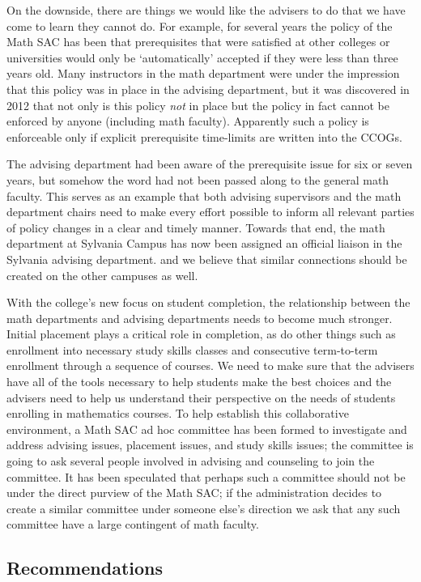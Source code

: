On the downside, there are things we would like the advisers to do that we
have come to learn they cannot do.  For example, for several years the policy
of the Math SAC has been that prerequisites that were satisfied at other
colleges or universities would only be `automatically' accepted if they were
less than three years old.  Many instructors in the math department were under
the impression that this policy was in place in the advising department, but it
was discovered in 2012 that not only is this policy \emph{not} in place but the policy in fact cannot be enforced by anyone
(including math faculty).   Apparently such a policy is enforceable only if
explicit prerequisite time-limits are written into the CCOGs.  

The advising department had been aware of the prerequisite issue for six or
seven years, but somehow the word had not been passed along to the general math
faculty.  This serves as an example that both advising supervisors and the math
department chairs need to make every effort possible to inform all relevant
parties of policy changes in a clear and timely manner.  Towards that end, the
math department at Sylvania Campus has now been assigned an official liaison in
the Sylvania advising department. and we believe that similar connections
should be created on the other campuses as well.

With the college's new focus on student completion, the relationship between
the math departments and advising departments needs to become much stronger.
Initial placement plays a critical role in completion, as do other things such
as enrollment into necessary study skills classes and consecutive term-to-term
enrollment through a sequence of courses.  We need to make sure that the
advisers have all of the tools necessary to help students make the best choices
and the advisers need to help us understand their perspective on the needs of
students enrolling in mathematics courses.  To help establish this
collaborative environment, a Math SAC ad hoc committee has been formed to
investigate and address advising issues, placement issues, and study
skills issues;  the committee is going to ask several people involved in
advising and counseling to join the committee.  It has been speculated that
perhaps such a committee should not be under the direct purview of the Math
SAC; if the administration decides to create a similar committee under
someone else's direction we ask that any such committee have a large contingent
of math faculty.

\subsection{Recommendations}

